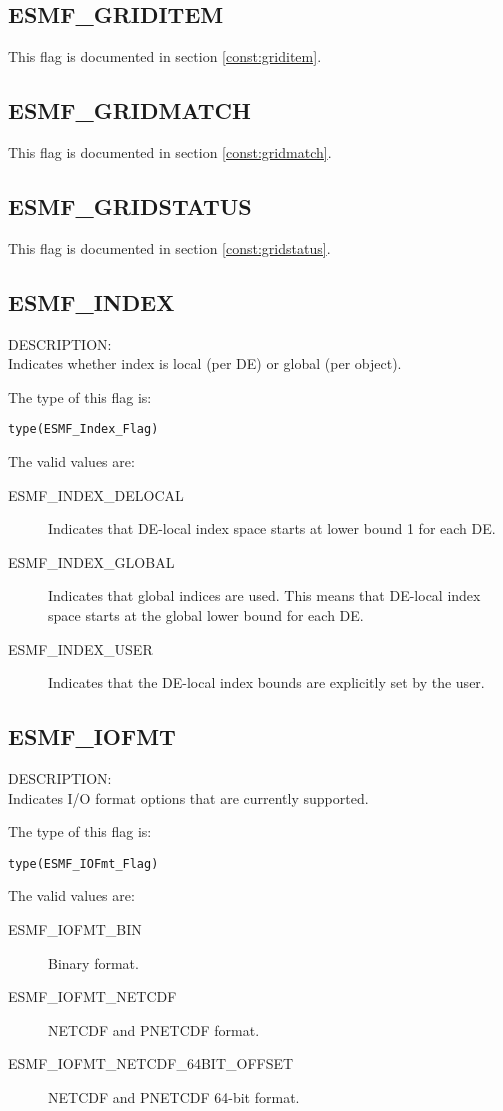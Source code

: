 \subsection{ESMF\_GRIDITEM}
This flag is documented in section \ref{const:griditem}.

\subsection{ESMF\_GRIDMATCH}
This flag is documented in section \ref{const:gridmatch}.

\subsection{ESMF\_GRIDSTATUS}
This flag is documented in section \ref{const:gridstatus}.

\subsection{ESMF\_INDEX}
\label{const:indexflag}
{\sf DESCRIPTION:\\}
Indicates whether index is local (per DE) or global (per object).

The type of this flag is:

{\tt type(ESMF\_Index\_Flag)}

The valid values are:
\begin{description}
\item [ESMF\_INDEX\_DELOCAL]
      Indicates that DE-local index space starts at lower bound 1 for each DE.
\item [ESMF\_INDEX\_GLOBAL]
      Indicates that global indices are used. This means that DE-local index
      space starts at the global lower bound for each DE.
\item [ESMF\_INDEX\_USER]
      Indicates that the DE-local index bounds are explicitly set by the user.
 \end{description}

\subsection{ESMF\_IOFMT}
\label{opt:iofmtflag}
{\sf DESCRIPTION:\\}
Indicates I/O format options that are currently supported.

The type of this flag is:

{\tt type(ESMF\_IOFmt\_Flag)}

The valid values are:
\begin{description}
\item [ESMF\_IOFMT\_BIN]
      Binary format.
\item [ESMF\_IOFMT\_NETCDF]
      NETCDF and PNETCDF format.
\item [ESMF\_IOFMT\_NETCDF\_64BIT\_OFFSET]
      NETCDF and PNETCDF 64-bit format.
\end{description}

